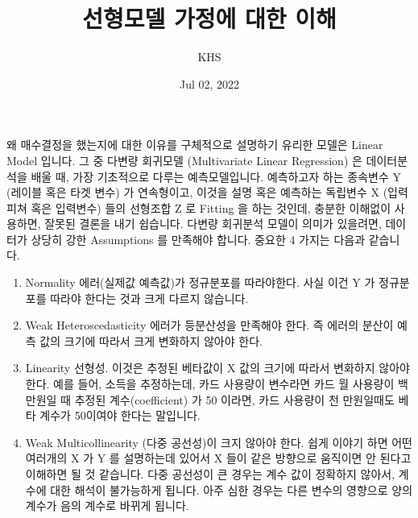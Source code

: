 \documentclass[letterpaper,10pt,english]{jupyterBook}
\title{선형모델 가정에 대한 이해}
\date{Jul 02, 2022}
\author{KHS}
\begin{document}
\pagestyle{empty}
\sphinxmaketitle
\pagestyle{plain}
\sphinxtableofcontents
\pagestyle{normal}
\label{\detokenize{chapter5/5.2.4_LM_Assumptions::doc}}


\sphinxAtStartPar
왜 매수결정을 했는지에 대한 이유를 구체적으로 설명하기 유리한 모델은 Linear Model 입니다. 그 중 다변량 회귀모델 (Multivariate Linear Regression) 은 데이터분석을 배울 때, 가장 기초적으로 다루는 예측모델입니다. 예측하고자 하는 종속변수 Y (레이블 혹은 타겟 변수) 가 연속형이고, 이것을 설명 혹은 예측하는 독립변수 X (입력피쳐 혹은 입력변수) 들의 선형조합 Z 로 Fitting 을 하는 것인데, 충분한 이해없이 사용하면, 잘못된 결론을 내기 쉽습니다. 다변량 회귀분석 모델이 의미가 있을려면, 데이터가 상당히 강한 Assumptions 를 만족해야 합니다. 중요한 4 가지는 다음과 같습니다.
\begin{enumerate}
%
\item {} 
\sphinxAtStartPar
Normality \sphinxhyphen{} 에러(실제값 \sphinxhyphen{} 예측값)가 정규분포를 따라야한다. 사실 이건 Y 가 정규분포를 따라야 한다는 것과 크게 다르지 않습니다.

\item {} 
\sphinxAtStartPar
Weak Heteroscedasticity \sphinxhyphen{} 에러가 등분산성을 만족해야 한다. 즉 에러의 분산이 예측 값의 크기에 따라서 크게 변화하지 않아야 한다.

\item {} 
\sphinxAtStartPar
Linearity \sphinxhyphen{} 선형성. 이것은 추정된 베타값이 X 값의 크기에 따라서 변화하지 않아야 한다. 예를 들어, 소득을 추정하는데, 카드 사용량이 변수라면 카드 월 사용량이 백만원일 때 추정된 계수(coefficient) 가 50 이라면, 카드 사용량이 천 만원일때도 베타 계수가 50이여야 한다는 말입니다.

\item {} 
\sphinxAtStartPar
Weak Multicollinearity \sphinxhyphen{} (다중 공선성)이 크지 않아야 한다. 쉽게 이야기 하면 어떤 여러개의 X 가 Y 를 설명하는데 있어서 X 들이 같은 방향으로 움직이면 안 된다고 이해하면 될 것 같습니다. 다중 공선성이 큰 경우는 계수 값이 정확하지 않아서, 계수에 대한 해석이 불가능하게 됩니다. 아주 심한 경우는 다른 변수의 영향으로 양의 계수가 음의 계수로 바뀌게 됩니다.

\end{enumerate}
\end{document}
